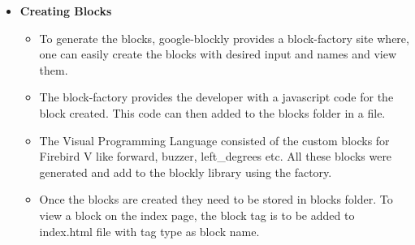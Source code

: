 \documentclass[a4paper,12pt,oneside]{book}
\begin{document}
  \begin{itemize}
   \item \textbf{Creating Blocks}\\
    \begin{itemize}
      \item 
      To generate the blocks, google-blockly provides a block-factory site where, one can easily create the blocks with desired input and names and view them.
      \item
      The block-factory provides the developer with a javascript code for the block created. This code can then added to the blocks folder in a file.
      \item
      The Visual Programming Language consisted of the custom blocks for Firebird V like forward, buzzer, left\_degrees etc. All these 
      blocks were generated and add to the blockly library using the factory.
      \item 
      Once the blocks are created they need to be stored in blocks folder. To view a block on the index page, the block tag
      is to be added to index.html file with tag type as block name.
    \end{itemize}
    

\end{itemize}
\end{document}
